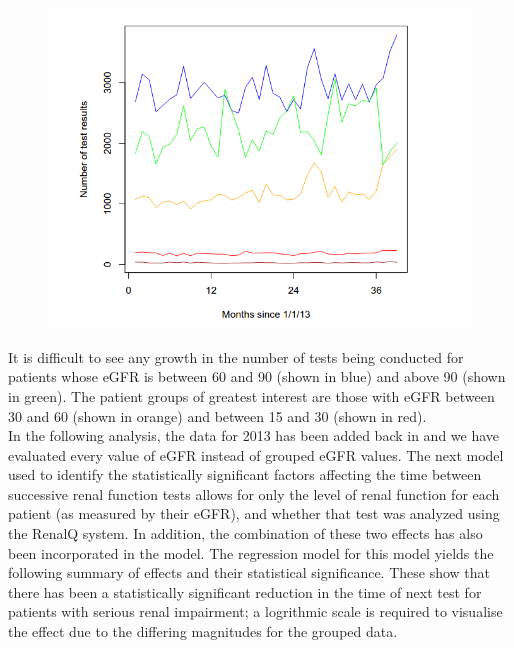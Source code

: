 ﻿\documentclass[11pt]{article}
\begin{document}
\begin{figure}[htp]
\centering
\includegraphics[scale=0.50]{fig6.png}
\caption{}
\label{}
\end{figure}

It is difficult to see any growth in the number of tests being conducted for patients whose eGFR is between 60 and 90 (shown in blue) and above 90 (shown in green). The patient groups of greatest interest are those with eGFR between 30 and 60 (shown in orange) and between 15 and 30 (shown in red).\\

In the following analysis, the data for 2013 has been added back in and we have evaluated every value of eGFR instead of grouped eGFR values. The next  model  used to identify the statistically significant factors affecting the time between successive renal function tests allows for only the level of renal function for each patient (as measured by their eGFR), and whether that test was analyzed using the RenalQ system. In addition, the combination of these two effects has also been incorporated in the model. The regression model for this model yields  the following summary of effects and their statistical significance. These show that there has been a statistically significant reduction in the time of next test for patients with serious renal impairment; a logrithmic scale is required to visualise the effect due to the differing magnitudes for the grouped data.\\
\end{document}
